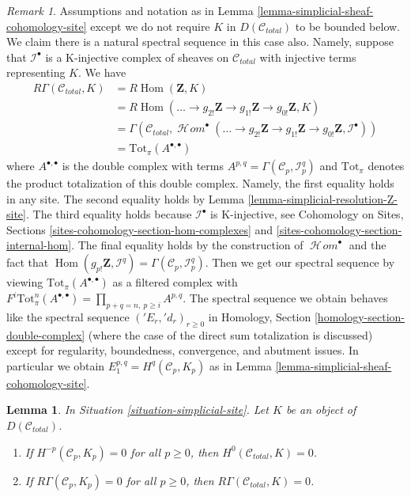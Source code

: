 \documentclass{stacks-project}
\theoremstyle{plain}
\newtheorem{lemma}[subsection]{Lemma}
\theoremstyle{definition}
\theoremstyle{remark}
\newtheorem{remark}[subsection]{Remark}
\numberwithin{equation}{subsection}
\def\Hom{\mathop{\mathrm{Hom}}\nolimits}
\def\SheafHom{\mathop{\mathcal{H}\!\mathit{om}}\nolimits}
\begin{document}
\begin{remark}
\label{remark-simplicial-cohomology-site}
Assumptions and notation as in
Lemma \ref{lemma-simplicial-sheaf-cohomology-site}
except we do not require $K$ in $D(\mathcal{C}_{total})$
to be bounded below. We claim there is a natural
spectral sequence in this case also. Namely, suppose
that $\mathcal{I}^\bullet$ is a K-injective complex of sheaves on
$\mathcal{C}_{total}$ with injective terms representing $K$.
We have
\begin{align*}
R\Gamma(\mathcal{C}_{total}, K)
& =
R\Hom(\mathbf{Z}, K) \\
& =
R\Hom(
\ldots \to g_{2!}\mathbf{Z} \to g_{1!}\mathbf{Z} \to g_{0!}\mathbf{Z}, K) \\
& =
\Gamma(\mathcal{C}_{total},
\SheafHom^\bullet(
\ldots \to g_{2!}\mathbf{Z} \to g_{1!}\mathbf{Z} \to g_{0!}\mathbf{Z},
\mathcal{I}^\bullet)) \\
& =
\text{Tot}_\pi(A^{\bullet, \bullet})
\end{align*}
where $A^{\bullet, \bullet}$ is the double complex with terms
$A^{p, q} = \Gamma(\mathcal{C}_p, \mathcal{I}^q_p)$ and $\text{Tot}_\pi$
denotes the product totalization of this double complex.
Namely, the first equality holds in any site. The second equality
holds by Lemma \ref{lemma-simplicial-resolution-Z-site}.
The third equality holds because $\mathcal{I}^\bullet$ is K-injective, see
Cohomology on Sites, Sections \ref{sites-cohomology-section-hom-complexes}
and \ref{sites-cohomology-section-internal-hom}.
The final equality holds by the construction of $\SheafHom^\bullet$
and the fact that $\Hom(g_{p!}\mathbf{Z}, \mathcal{I}^q) =
\Gamma(\mathcal{C}_p, \mathcal{I}^q_p)$.
Then we get our spectral sequence by viewing
$\text{Tot}_\pi(A^{\bullet, \bullet})$ as a filtered
complex with $F^i\text{Tot}^n_\pi(A^{\bullet, \bullet}) =
\prod_{p + q = n,\ p \geq i} A^{p, q}$. The spectral sequence
we obtain behaves like the spectral sequence $({}'E_r, {}'d_r)_{r \geq 0}$ in
Homology, Section \ref{homology-section-double-complex}
(where the case of the direct sum totalization
is discussed) except for regularity, boundedness, convergence, and
abutment issues. In particular we obtain $E_1^{p, q} = H^q(\mathcal{C}_p, K_p)$
as in Lemma \ref{lemma-simplicial-sheaf-cohomology-site}.
\end{remark}

\begin{lemma}
\label{lemma-simplicial-sheaf-cohomology-site-zero}
In Situation \ref{situation-simplicial-site}. Let $K$ be an object of
$D(\mathcal{C}_{total})$.
\begin{enumerate}
\item If $H^{-p}(\mathcal{C}_p, K_p) = 0$ for all $p \geq 0$, then
$H^0(\mathcal{C}_{total}, K) = 0$.
\item If $R\Gamma(\mathcal{C}_p, K_p) = 0$
for all $p \geq 0$, then $R\Gamma(\mathcal{C}_{total}, K) = 0$.
\end{enumerate}
\end{lemma}
\end{document}
